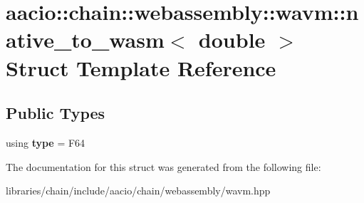\hypertarget{structaacio_1_1chain_1_1webassembly_1_1wavm_1_1native__to__wasm_3_01double_01_4}{}\section{aacio\+:\+:chain\+:\+:webassembly\+:\+:wavm\+:\+:native\+\_\+to\+\_\+wasm$<$ double $>$ Struct Template Reference}
\label{structaacio_1_1chain_1_1webassembly_1_1wavm_1_1native__to__wasm_3_01double_01_4}
\subsection*{Public Types}
\begin{DoxyCompactItemize}
\item 
\mbox{\label{structaacio_1_1chain_1_1webassembly_1_1wavm_1_1native__to__wasm_3_01double_01_4_a86354b20779b7e8a9d029236f49b1419}} 
using {\bfseries type} = F64
\end{DoxyCompactItemize}


The documentation for this struct was generated from the following file\+:\begin{DoxyCompactItemize}
\item 
libraries/chain/include/aacio/chain/webassembly/wavm.\+hpp\end{DoxyCompactItemize}
